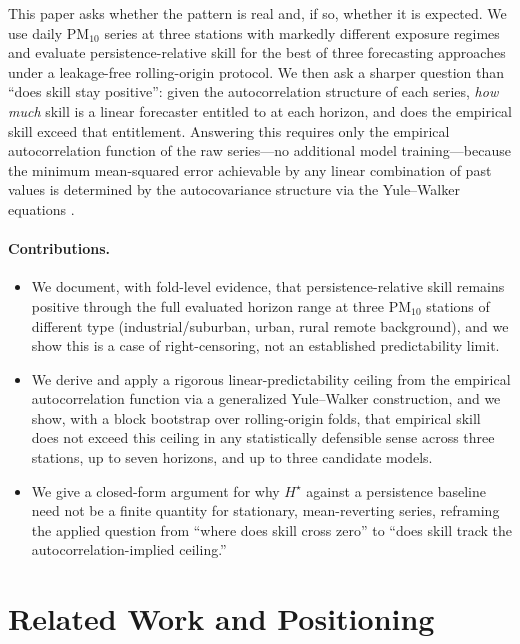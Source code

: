 \documentclass{article}
\newcommand{\hstar}{H^{\star}}
\begin{document}
This paper asks whether the pattern is real and, if so, whether it is
expected.
We use daily PM$_{10}$ series at three stations with markedly different
exposure regimes and evaluate persistence-relative skill for the best of three
forecasting approaches under a leakage-free rolling-origin protocol.
We then ask a sharper question than ``does skill stay positive'': given the
autocorrelation structure of each series, \emph{how much} skill is a linear
forecaster entitled to at each horizon, and does the empirical skill exceed
that entitlement.
Answering this requires only the empirical autocorrelation function of the raw
series---no additional model training---because the minimum mean-squared error
achievable by any linear combination of past values is determined by the
autocovariance structure via the Yule--Walker equations
\citep{boxjenkins2015}.

\paragraph{Contributions.}
\begin{itemize}
  \item We document, with fold-level evidence, that persistence-relative
    skill remains positive through the full evaluated horizon range at three
    PM$_{10}$ stations of different type (industrial/suburban, urban, rural
    remote background), and we show this is a case of right-censoring, not an
    established predictability limit.
  \item We derive and apply a rigorous linear-predictability ceiling from the
    empirical autocorrelation function via a generalized Yule--Walker
    construction, and we show, with a block bootstrap over rolling-origin
    folds, that empirical skill does not exceed this ceiling in any
    statistically defensible sense across three stations, up to seven
    horizons, and up to three candidate models.
  \item We give a closed-form argument for why $\hstar$ against a persistence
    baseline need not be a finite quantity for stationary, mean-reverting
    series, reframing the applied question from ``where does skill cross
    zero'' to ``does skill track the autocorrelation-implied ceiling.''
\end{itemize}

\section{Related Work and Positioning}
\end{document}
